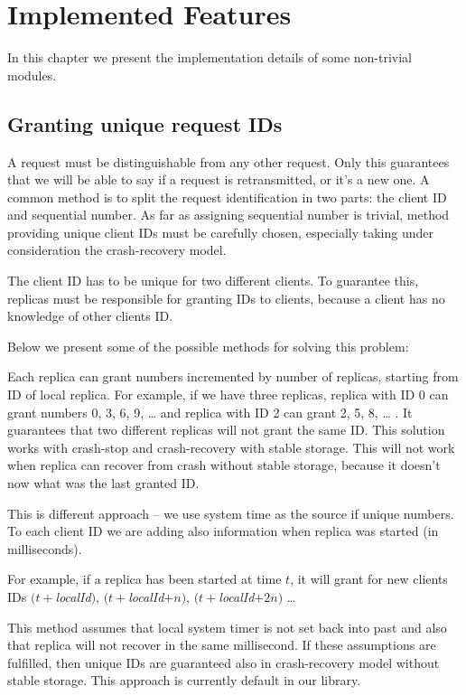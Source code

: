 \chapter{Implemented Features}

In this chapter we present the implementation details of some non-trivial modules.

\section{Granting unique request IDs}

A request must be distinguishable from any other request. Only this guarantees that we will be able to say if a request is retransmitted, or it's a new one. A common method is to split the request identification in two parts: the client ID and sequential number. As far as assigning sequential number is trivial, method providing unique client IDs must be carefully chosen, especially taking under consideration the crash-recovery model.

The client ID has to be unique for two different clients. To guarantee this, replicas must be responsible for granting IDs to clients, because a client has no knowledge of other clients ID.

Below we present some of the possible methods for solving this problem:

Each replica can grant numbers incremented by number of replicas, starting from ID of local replica. For example, if we have three replicas, replica with ID 0 can grant numbers 0, 3, 6, 9, \ldots{} and replica with ID 2 can grant 2, 5, 8, \ldots{} . It guarantees that two different replicas will not grant the same ID. This solution works with crash-stop and crash-recovery with stable storage. This will not work when replica can recover from crash without stable storage, because it doesn't now what was the last granted ID.

This is different approach -- we use system time as the source if unique numbers. To each client ID we are adding also information when replica was started (in milliseconds).

For example, if a replica has been started at time $t$, it will grant for new clients IDs $(t + $\textit{localId}$)$, $(t + $\textit{localId}$ + n)$, $(t + $\textit{localId}$ + 2n)$ \ldots

This method assumes that local system timer is not set back into past and also that replica will not recover in the same millisecond. If these assumptions are fulfilled, then unique IDs are guaranteed also in crash-recovery model without stable storage. This approach is currently default in our library.

